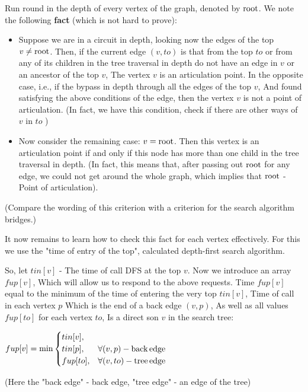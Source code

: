 Run round in the depth of every vertex of the graph, denoted by $\rm root$. We note the following \textbf{fact} (which is not hard to prove):

\begin{itemize}

\item Suppose we are in a circuit in depth, looking now the edges of the top $v \ne {\rm root}$. Then, if the current edge $(v, to)$ is that from the top $to$ or from any of its children in the tree traversal in depth do not have an edge in $v$ or an ancestor of the top $v$, The vertex $v$ is an articulation point. In the opposite case, i.e., if the bypass in depth through all the edges of the top $v$, And found satisfying the above conditions of the edge, then the vertex $v$ is not a point of articulation. (In fact, we have this condition, check if there are other ways of $v$ in $to$ )

\item Now consider the remaining case: $v = {\rm root}$. Then this vertex is an articulation point if and only if this node has more than one child in the tree traversal in depth. (In fact, this means that, after passing out $\rm root$ for any edge, we could not get around the whole graph, which implies that $\rm root$ - Point of articulation).

\end{itemize}

(Compare the wording of this criterion with a criterion for the search algorithm bridges.)

It now remains to learn how to check this fact for each vertex effectively. For this we use the "time of entry of the top", calculated depth-first search algorithm.

So, let $tin [v]$ - The time of call DFS at the top $v$. Now we introduce an array $fup [v]$, Which will allow us to respond to the above requests. Time $fup [v]$ equal to the minimum of the time of entering the very top $tin [v]$, Time of call in each vertex $p$ Which is the end of a back edge $(v, p)$, As well as all values $fup [to]$ for each vertex $to$, Is a direct son $v$ in the search tree:

$fup[v]=\min\begin{cases}
tin[v],\\
tin[p], & \forall(v,p)-{\rm back\, edge}\\
fup[to], & \forall(v,to)-{\rm tree\, edge}
\end{cases}$

(Here the "back edge" - back edge, "tree edge" - an edge of the tree)

